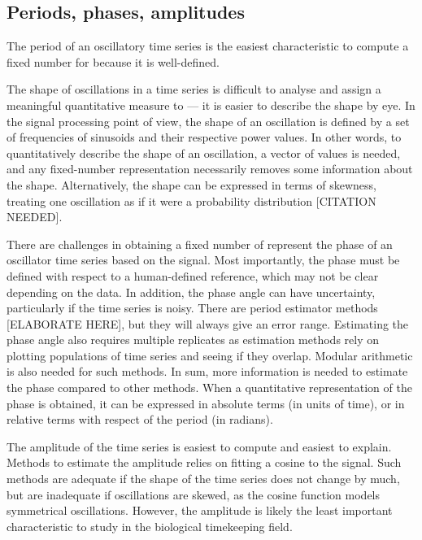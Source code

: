 \subsection{Periods, phases, amplitudes}
\label{subsec:analysis-characterisation-quantities}


The period of an oscillatory time series is the easiest characteristic to compute a fixed number for because it is well-defined.

The shape of oscillations in a time series is difficult to analyse and assign a meaningful quantitative measure to --- it is easier to describe the shape by eye.
In the signal processing point of view, the shape of an oscillation is defined by a set of frequencies of sinusoids and their respective power values.
In other words, to quantitatively describe the shape of an oscillation, a vector of values is needed, and any fixed-number representation necessarily removes some information about the shape.
Alternatively, the shape can be expressed in terms of skewness, treating one oscillation as if it were a probability distribution [CITATION NEEDED].

There are challenges in obtaining a fixed number of represent the phase of an oscillator time series based on the signal.
Most importantly, the phase must be defined with respect to a human-defined reference, which may not be clear depending on the data.
In addition, the phase angle can have uncertainty, particularly if the time series is noisy.
There are period estimator methods [ELABORATE HERE], but they will always give an error range.
Estimating the phase angle also requires multiple replicates as estimation methods rely on plotting populations of time series and seeing if they overlap.
Modular arithmetic is also needed for such methods.
In sum, more information is needed to estimate the phase compared to other methods.
When a quantitative representation of the phase is obtained, it can be expressed in absolute terms (in units of time), or in relative terms with respect of the period (in radians).

The amplitude of the time series is easiest to compute and easiest to explain.
Methods to estimate the amplitude relies on fitting a cosine to the signal.
Such methods are adequate if the shape of the time series does not change by much, but are inadequate if oscillations are skewed, as the cosine function models symmetrical oscillations.
However, the amplitude is likely the least important characteristic to study in the biological timekeeping field.

